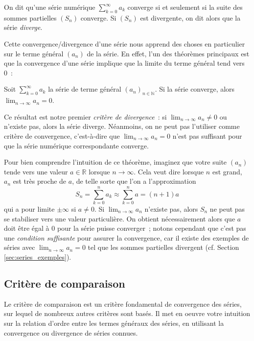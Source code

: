 \begin{boxdef}
On dit qu'une série numérique $\displaystyle\sum_{k=0}^{\infty} a_k$ converge si et seulement si la suite des sommes partielles $(S_n)$ converge. Si $(S_n)$ est divergente, on dit alors que la série \emph{diverge}.
\end{boxdef}
Cette convergence/divergence d'une série nous apprend des choses en particulier sur le terme général $(a_n)$ de la série. En effet, l'un des théorèmes principaux est que la convergence d'une série implique que la limite du terme général tend vers 0~:
\begin{boxthm}\label{thm:condition_necessaire}
Soit $\displaystyle\sum_{k=0}^{\infty} a_k$ la série de terme général $(a_n)_{n \in \mathbb{N}}$. Si la série converge, alors $\displaystyle\lim_{n \to \infty} a_n = 0$.
\end{boxthm}
Ce résultat est notre premier \emph{critère de divergence}~: si $\displaystyle\lim_{n \to \infty} a_n \neq 0$ ou n'existe pas, alors la série diverge. Néanmoins, on ne peut pas l'utiliser comme critère de convergence, c'est-à-dire que $\displaystyle\lim_{n \to \infty} a_n = 0$ n'est pas suffisant pour que la série numérique correspondante converge.

Pour bien comprendre l'intuition de ce théorème, imaginez que votre suite $(a_n)$ tende vers une valeur $a \in \mathbb{R}$ lorsque $n \to \infty$. Cela veut dire lorsque $n$ est grand, $a_n$ est très proche de $a$, de telle sorte que l'on a l'approximation
\begin{equation}
S_n = \sum_{k = 0}^{n} a_k \approx \sum_{k = 0}^{n} a = (n+1)a
\end{equation}
qui a pour limite $\pm\infty$ si $a \neq 0$. Si $\displaystyle\lim_{n \to \infty} a_n$ n'existe pas, alors $S_n$ ne peut pas se stabiliser vers une valeur particulière. On obtient nécessairement alors que $a$ doit être égal à $0$ pour la série puisse converger~; notons cependant que c'est pas une \emph{condition suffisante} pour assurer la convergence, car il existe des exemples de séries avec $\displaystyle\lim_{n \to \infty} a_n = 0$ tel que les sommes partielles divergent (cf. Section \ref{sec:series_exemples}).

\subsection{Critère de comparaison}
Le critère de comparaison est un critère fondamental de convergence des séries, sur lequel de nombreux autres critères sont basés. Il met en oeuvre votre intuition sur la relation d'ordre entre les termes généraux des séries, en utilisant la convergence ou divergence de séries connues.

